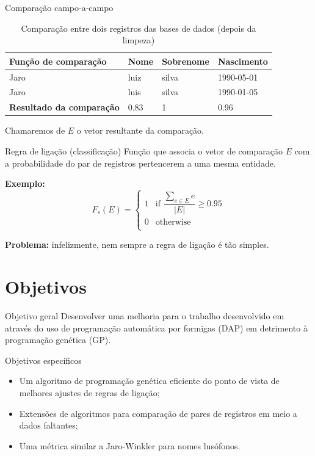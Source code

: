 \documentclass{beamer}
\begin{document}
  \begin{frame}{Comparação campo-a-campo}
      \begin{table}[]
          \centering
          \caption{Comparação entre dois registros das bases de dados (depois da limpeza)}
          \label{tbl:comparacao}
          \begin{tabular}{|l|l|l|l|}
              \hline
              Função de comparação             & Nome & Sobrenome & Nascimento \\ \hline
              Jaro                             & luiz & silva     & 1990-05-01 \\
              Jaro                             & luis & silva     & 1990-01-05 \\ \hline
              \textbf{Resultado da comparação} & 0.83 & 1         & 0.96       \\ \hline
          \end{tabular}
      \end{table}

      Chamaremos de $E$ o vetor resultante da comparação.
  \end{frame}
  \begin{frame}{Regra de ligação (classificação)}
      Função que associa o vetor de comparação $E$ com a probabilidade do par de registros pertencerem a uma mesma entidade.

      \textbf{Exemplo:} \[
          F_s(E) = \begin{cases}
              1  &  \text{if }\dfrac{\sum \limits_{e \in E} e}{|E|} \geq 0.95 \\
              0  &  \text{otherwise} \\
          \end{cases}
      \]

      \textbf{Problema:} infelizmente, nem sempre a regra de ligação é tão simples.
  \end{frame}

  \section{Objetivos}
  \begin{frame}{Objetivo geral}
      Desenvolver uma melhoria para o trabalho desenvolvido em \cite{geneticrl} através do uso de programação automática por formigas (DAP) em detrimento à programação genética (GP).
  \end{frame}
  \begin{frame}{Objetivos específicos}
      \begin{itemize}
          \item Um algoritmo de programação genética eficiente do ponto de vista de melhores ajustes de regras de ligação;
          \item Extensões de algoritmos para comparação de pares de registros em meio a dados faltantes;
          \item Uma métrica similar a Jaro-Winkler para nomes lusófonos.
      \end{itemize}
  \end{frame}
\end{document}

